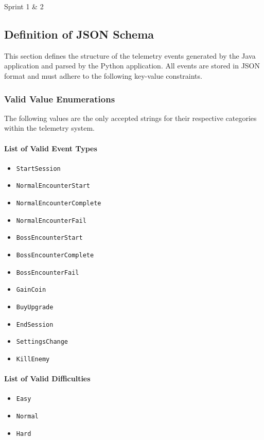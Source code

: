 Sprint 1 \& 2

\subsection{Definition of JSON Schema}
This section defines the structure of the telemetry events generated by the Java application and parsed by the Python application. All events are stored in JSON format and must adhere to the following key-value constraints.

\subsubsection{Valid Value Enumerations}
The following values are the only accepted strings for their respective categories within the telemetry system.

\paragraph{List of Valid Event Types}
\begin{itemize}
    \item \texttt{StartSession}
    \item \texttt{NormalEncounterStart}
    \item \texttt{NormalEncounterComplete}
    \item \texttt{NormalEncounterFail}
    \item \texttt{BossEncounterStart}
    \item \texttt{BossEncounterComplete}
    \item \texttt{BossEncounterFail}
    \item \texttt{GainCoin}
    \item \texttt{BuyUpgrade}
    \item \texttt{EndSession}
    \item \texttt{SettingsChange}
    \item \texttt{KillEnemy}
\end{itemize}

\paragraph{List of Valid Difficulties}
\begin{itemize}
    \item \texttt{Easy}
    \item \texttt{Normal}
    \item \texttt{Hard}
\end{itemize}

